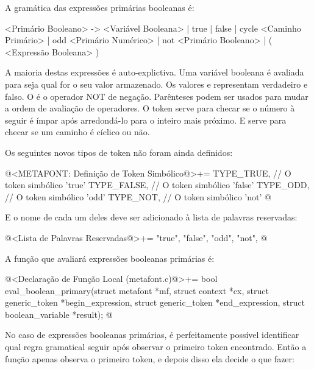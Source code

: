 {

A gramática das expressões primárias booleanas é:

\alinhaverbatim
<Primário Booleano> -> <Variável Booleana> | true | false |
                       cycle <Caminho Primário> | odd <Primário Numérico> |
                       not <Primário Booleano> |
                       ( <Expressão Booleana> )
\alinhanormal

A maioria destas expressões é auto-explictiva. Uma variável booleana é
avaliada para seja qual for o seu valor armazenado. Os
valores  e  representam verdadeiro
e falso. O  é o operador NOT de negação. Parênteses
podem ser usados para mudar a ordem de avaliação de operadores. O
token  serve para checar se o número à seguir é ímpar
após arredondá-lo para o inteiro mais próximo. E 
serve para checar se um caminho é cíclico ou não.

Os seguintes novos tipos de token não foram ainda definidos:

\iniciocodigo
@<METAFONT: Definição de Token Simbólico@>+=
TYPE_TRUE,                    // O token simbólico 'true'
TYPE_FALSE,                   // O token simbólico 'false'
TYPE_ODD,                     // O token simbólico 'odd'
TYPE_NOT,                     // O token simbólico 'not'
@
\fimcodigo

E o nome de cada um deles deve ser adicionado à lista de palavras
reservadas:

\iniciocodigo
@<Lista de Palavras Reservadas@>+=
"true", "false", "odd", "not",
@
\fimcodigo

A função que avaliará expressões booleanas primárias é:

\iniciocodigo
@<Declaração de Função Local (metafont.c)@>+=
bool eval_boolean_primary(struct metafont *mf, struct context *cx,
                          struct generic_token *begin_expression,
                          struct generic_token *end_expression,
                          struct boolean_variable *result);
@
\fimcodigo

No caso de expressões booleanas primárias, é perfeitamente possível
identificar qual regra gramatical seguir após observar o primeiro
token encontrado. Então a função apenas observa o primeiro token, e
depois disso ela decide o que fazer:

}
